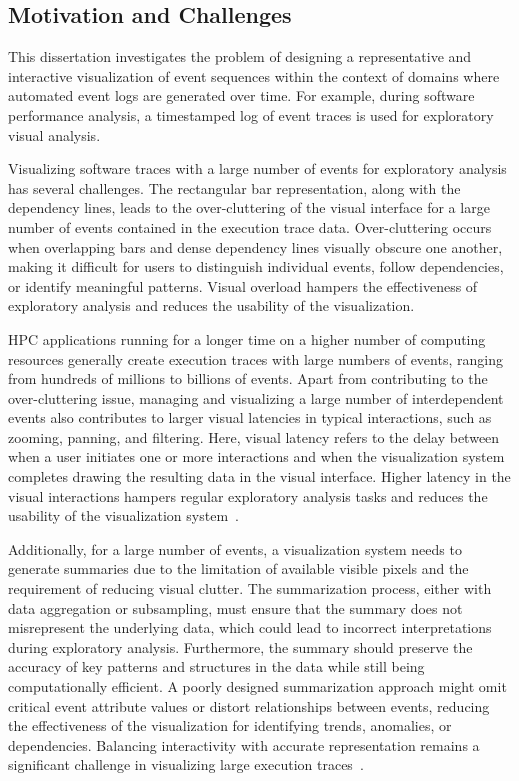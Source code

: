 \begin{refsection}
\section{Motivation and Challenges}
\label{sec:challenges}

This dissertation investigates the problem of designing a representative and interactive visualization of event sequences within the context of domains where automated event logs are generated over time. For example, during software performance analysis, a timestamped log of event traces is used for exploratory visual analysis.

Visualizing software traces with a large number of events for exploratory analysis has several challenges. The rectangular bar representation, along with the dependency lines, leads to the over-cluttering of the visual interface for a large number of events contained in the execution trace data. Over-cluttering occurs when overlapping bars and dense dependency lines visually obscure one another, making it difficult for users to distinguish individual events, follow dependencies, or identify meaningful patterns. Visual overload hampers the effectiveness of exploratory analysis and reduces the usability of the visualization.

HPC applications running for a longer time on a higher number of computing resources generally create execution traces with large numbers of events, ranging from hundreds of millions to billions of events. Apart from contributing to the over-cluttering issue, managing and visualizing a large number of interdependent events also contributes to larger visual latencies in typical interactions, such as zooming, panning, and filtering. Here, visual latency refers to the delay between when a user initiates one or more interactions and when the visualization system completes drawing the resulting data in the visual interface. Higher latency in the visual interactions hampers regular exploratory analysis tasks and reduces the usability of the visualization system~\cite{liu2014latency, davidson2023qualitative, battle2019role}.

Additionally, for a large number of events, a visualization system needs to generate summaries due to the limitation of available visible pixels and the requirement of reducing visual clutter. The summarization process, either with data aggregation or subsampling, must ensure that the summary does not misrepresent the underlying data, which could lead to incorrect interpretations during exploratory analysis. Furthermore, the summary should preserve the accuracy of key patterns and structures in the data while still being computationally efficient. A poorly designed summarization approach might omit critical event attribute values or distort relationships between events, reducing the effectiveness of the visualization for identifying trends, anomalies, or dependencies. Balancing interactivity with accurate representation remains a significant challenge in visualizing large execution traces~\cite{davidson2023qualitative, isaacs2014state}.


\end{refsection}
